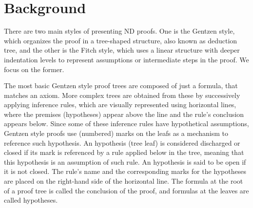 \section{Background}
There are two main styles of presenting ND proofs. One is the Gentzen style, which organizes the proof in a tree-shaped structure, also known as deduction tree, and the other is the Fitch style, which uses a linear structure with deeper indentation levels to represent assumptions or intermediate steps in the proof. We focus on the former. 

The most basic Gentzen style proof trees are composed of just a formula, that matches an axiom. More complex trees are obtained from these by successively applying inference rules, which are visually represented using horizontal lines, where the premises (hypotheses) appear above the line and the rule’s conclusion appears below. Since some of these inference rules have hypothetical assumptions, Gentzen style proofs use (numbered) marks on the leafs as a mechanism to reference such hypothesis. An hypothesis (tree leaf) is considered discharged or closed if its mark is referenced by a rule applied below in the tree, meaning that this hypothesis is an assumption of such rule. An hypothesis is said to be open if it is not closed. The rule’s name and the corresponding marks for the hypotheses are placed on the right-hand side of the horizontal line.
The formula at the root of a proof tree is called the conclusion of the proof, and formulas at the leaves are called hypotheses.   

